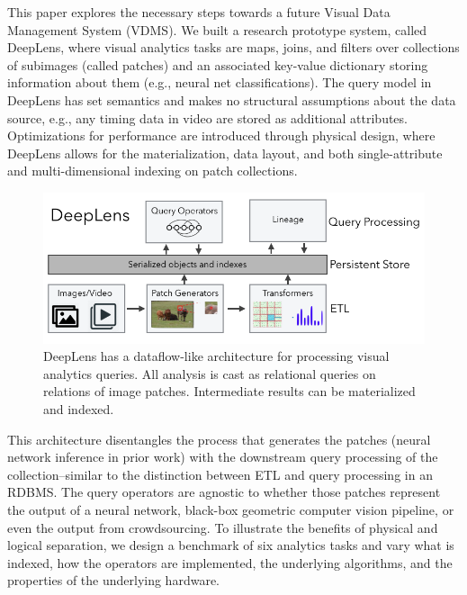 This paper explores the necessary steps towards a future Visual Data Management System (VDMS).
We built a research prototype system, called \textsf{DeepLens}, where visual analytics tasks are maps, joins, and filters over collections of subimages (called patches) and an associated key-value dictionary storing information about them (e.g., neural net classifications). The query model in \textsf{DeepLens} has set semantics and makes no structural assumptions about the data source, e.g., any timing data in video are stored as additional attributes. Optimizations for performance are introduced through physical design, where \textsf{DeepLens} allows for the materialization, data layout, and both single-attribute and multi-dimensional indexing on patch collections.

\begin{figure}[t]
\centering
 \includegraphics[width=\columnwidth]{figures/teaser.png}
 \caption{DeepLens has a dataflow-like architecture for processing visual analytics queries. All analysis is cast as relational queries on relations of image patches. Intermediate results can be materialized and indexed.  \label{teaser} }
\end{figure}

This architecture disentangles the process that generates the patches (neural network inference in prior work) with the downstream query processing of the collection--similar to the distinction between ETL and query processing in an RDBMS.
The query operators are agnostic to whether those patches represent the output of a neural network, black-box geometric computer vision pipeline, or even the output from crowdsourcing. 
To illustrate the benefits of physical and logical separation, we design a benchmark of six analytics tasks and vary what is indexed, how the operators are implemented, the underlying algorithms, and the properties of the underlying hardware.
 
